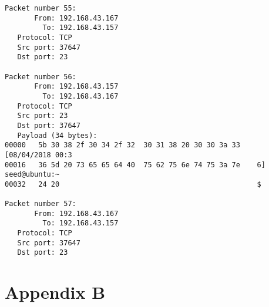 \documentclass[a4paper,12pt]{article}
\begin{document}
\begin{verbatim}
Packet number 55:
       From: 192.168.43.167
         To: 192.168.43.157
   Protocol: TCP
   Src port: 37647
   Dst port: 23

Packet number 56:
       From: 192.168.43.157
         To: 192.168.43.167
   Protocol: TCP
   Src port: 23
   Dst port: 37647
   Payload (34 bytes):
00000   5b 30 38 2f 30 34 2f 32  30 31 38 20 30 30 3a 33    [08/04/2018 00:3
00016   36 5d 20 73 65 65 64 40  75 62 75 6e 74 75 3a 7e    6] seed@ubuntu:~
00032   24 20                                               $ 

Packet number 57:
       From: 192.168.43.167
         To: 192.168.43.157
   Protocol: TCP
   Src port: 37647
   Dst port: 23

\end{verbatim}

\newpage
\section{Appendix B}
\end{document}
